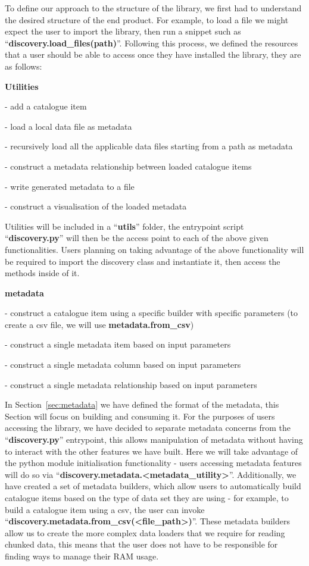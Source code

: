 To define our approach to the structure of the library, we first had to understand the desired structure of the end
product.
For example, to load a file we might expect the user to import the library, then run a snippet such as
``\textbf{discovery.load\_files(path)}''.
Following this process, we defined the resources that a user should be able to access once they have installed the
library, they are as follows:

\bigbreak
\textbf{Utilities}

- add a catalogue item

- load a local data file as metadata

- recursively load all the applicable data files starting from a path as metadata

- construct a metadata relationship between loaded catalogue items

- write generated metadata to a file

- construct a visualisation of the loaded metadata

Utilities will be included in a ``\textbf{utils}'' folder, the entrypoint script ``\textbf{discovery.py}'' will then be
the access point to each of the above given functionalities.
Users planning on taking advantage of the above functionality will be required to import the discovery class and
instantiate it, then access the methods inside of it.

\bigbreak
\textbf{metadata}

- construct a catalogue item using a specific builder with specific parameters (to create a csv file, we will use
\textbf{metadata.from\_csv})

- construct a single metadata item based on input parameters

- construct a single metadata column based on input parameters

- construct a single metadata relationship based on input parameters

In Section~\ref{sec:metadata} we have defined the format of the metadata, this Section will focus on building and
consuming it.
For the purposes of users accessing the library, we have decided to separate metadata concerns from the
``\textbf{discovery.py}'' entrypoint, this allows manipulation of metadata without having to interact with the other
features we have built.
Here we will take advantage of the python module initialisation functionality - users accessing metadata features
will do so via ``\textbf{discovery.metadata.<metadata\_utility>}''.
Additionally, we have created a set of metadata builders, which allow users to automatically build catalogue items
based on the type of data set they are using - for example, to build a catalogue item using a csv, the user can invoke
``\textbf{discovery.metadata.from\_csv(<file\_path>)}''.
These metadata builders allow us to create the more complex data loaders that we require for reading chunked data, this
means that the user does not have to be responsible for finding ways to manage their RAM usage.

